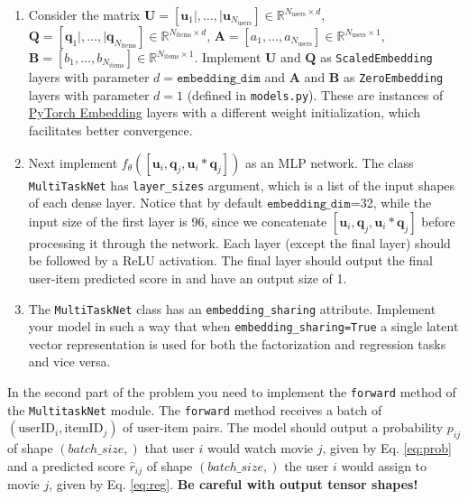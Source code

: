 \documentclass[12pt]{article}
\begin{document}
\begin{enumerate}
    \item Consider the matrix $\mathbf{U} = [\mathbf{u}_1|,\ldots,|\mathbf{u}_{N_{\text{users}}}]\in\mathbb{R}^{N_{\text{users}}\times d}$, $\mathbf{Q} = [\mathbf{q}_1|,\ldots,|\mathbf{q}_{N_{\text{items}}}]\in\mathbb{R}^{N_{\text{items}}\times d}$, $\mathbf{A} = [a_1, \ldots, a_{N_{\text{users}}}]\in \mathbb{R}^{N_{\text{users}}\times 1}$, $\mathbf{B} = [b_1, \ldots, b_{N_{\text{items}}}]\in \mathbb{R}^{N_{\text{items}}\times 1}$. Implement $\mathbf{U}$ and $\mathbf{Q}$ as \texttt{ScaledEmbedding} layers  with parameter $d=\texttt{embedding\_dim}$ and $\mathbf{A}$ and $\mathbf{B}$ as \texttt{ZeroEmbedding} layers with parameter $d=1$ (defined in \texttt{models.py}). These are instances of \href{https://pytorch.org/docs/stable/generated/torch.nn.Embedding.html}{PyTorch Embedding} layers with a different weight initialization, which facilitates better convergence.
    
    \item Next implement $f_{\theta}([\mathbf{u}_i, \mathbf{q}_j, \mathbf{u}_i * \mathbf{q}_j])$ as an MLP network. The class \texttt{MultiTaskNet} has \texttt{layer\_sizes} argument, which is a list of the input shapes of each dense layer. Notice that by default $\texttt{embedding\_dim}$=32, while the input size of the first layer is 96, since we concatenate $[\mathbf{u}_i, \mathbf{q}_j, \mathbf{u}_i * \mathbf{q}_j]$ before processing it through the network. Each layer (except the final layer) should be followed by a ReLU activation. The final layer should output the final user-item predicted score in and have an output size of 1.
    
    \item The \texttt{MultiTaskNet} class has an \texttt{embedding\_sharing} attribute. Implement your model in such a way that when  \texttt{embedding\_sharing=True} a single latent vector representation is used for both the factorization and regression tasks and vice versa. 
    
\end{enumerate}
    
\noindent In the second part of the problem you need to implement the \texttt{forward} method of the \texttt{MultitaskNet} module. The \texttt{forward} method receives a batch of $(\text{userID}_i, \text{itemID}_j)$ of user-item pairs. The model should output a probability $p_{ij}$ of shape $(batch\_size,)$ that user $i$ would watch movie $j$, given by Eq. \ref{eq:prob} and a predicted score $\hat{r}_{ij}$ of shape $(batch\_size,)$ the user $i$ would assign to movie $j$, given by Eq. \ref{eq:reg}. \textbf{Be careful with output tensor shapes!}
\end{document}
